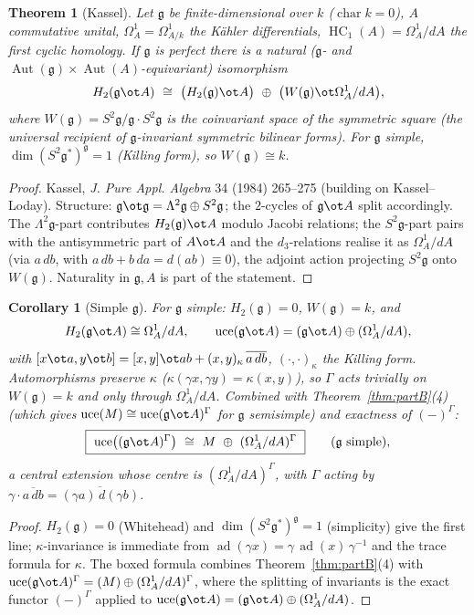 \documentclass{amsart}
\newtheorem{theorem}{Theorem}
\newtheorem{corollary}{Corollary}
\theoremstyle{definition}
\DeclareMathOperator{\uce}{uce}
\DeclareMathOperator{\HC}{HC}
\DeclareMathOperator{\Aut}{Aut}
\newcommand{\g}{\mathfrak{g}}
\newcommand{\Om}{\Omega}
\newcommand{\Gm}{\Gamma}
\begin{document}
\begin{theorem}[Kassel]\label{thm:kassel}
Let $\g$ be finite-dimensional over $k$ ($\operatorname{char}k=0$), $A$
commutative unital, $\Om^1_A=\Om^1_{A/k}$ the Kähler differentials,
$\HC_1(A)=\Om^1_A/dA$ the first cyclic homology.  If $\g$ is perfect there is a
natural ($\g$- and $\Aut(\g)\!\times\!\Aut(A)$-equivariant) isomorphism
\begin{equation}\label{eq:kassel}
   H_2(\g\ot A)\ \cong\ \bigl(H_2(\g)\ot A\bigr)\ \oplus\
   \bigl(W(\g)\ot\Om^1_A/dA\bigr),
\end{equation}
where $W(\g)=S^2\g/\g\!\cdot\!S^2\g$ is the coinvariant space of the symmetric
square (the universal recipient of $\g$-invariant symmetric bilinear forms).  For
$\g$ simple, $\dim(S^2\g^*)^{\g}=1$ (Killing form), so $W(\g)\cong k$.
\end{theorem}
\begin{proof}
Kassel, \emph{J. Pure Appl. Algebra} 34 (1984) 265--275 (building on
Kassel--Loday).  Structure: $\g\ot\g=\Lambda^2\g\oplus S^2\g$; the $2$-cycles of
$\g\ot A$ split accordingly.  The $\Lambda^2\g$-part contributes $H_2(\g)\ot A$
modulo Jacobi relations; the $S^2\g$-part pairs with the antisymmetric part of
$A\ot A$ and the $d_3$-relations realise it as $\Om^1_A/dA$ (via $a\,db$, with
$a\,db+b\,da=d(ab)\equiv0$), the adjoint action projecting $S^2\g$ onto $W(\g)$.
Naturality in $\g,A$ is part of the statement.
\end{proof}

\begin{corollary}[Simple $\g$]\label{cor:simple}
For $\g$ simple: $H_2(\g)=0$, $W(\g)=k$, and
\[
   H_2(\g\ot A)\cong\Om^1_A/dA,\qquad
   \uce(\g\ot A)=(\g\ot A)\oplus(\Om^1_A/dA),
\]
with $[x\ot a,y\ot b]=[x,y]\ot ab+(x,y)_\kappa\,\overline{a\,db}$,
$(\cdot,\cdot)_\kappa$ the Killing form.  Automorphisms preserve $\kappa$
($\kappa(\gamma x,\gamma y)=\kappa(x,y)$), so $\Gm$ acts trivially on $W(\g)=k$
and only through $\Om^1_A/dA$.  Combined with Theorem~\ref{thm:partB}(4) (which
gives $\uce(M)\cong\uce(\g\ot A)^{\Gm}$ for $\g$ semisimple) and exactness of
$(-)^{\Gm}$:
\[
   \boxed{\ \uce\bigl((\g\ot A)^{\Gm}\bigr)\ \cong\ M\ \oplus\ (\Om^1_A/dA)^{\Gm}\ }
   \qquad(\g\ \text{simple}),
\]
a central extension whose centre is $(\Om^1_A/dA)^{\Gm}$, with $\Gm$ acting by
$\gamma\cdot\overline{a\,db}=\overline{(\gamma a)\,d(\gamma b)}$.
\end{corollary}
\begin{proof}
$H_2(\g)=0$ (Whitehead) and $\dim(S^2\g^*)^\g=1$ (simplicity) give the first line;
$\kappa$-invariance is immediate from $\operatorname{ad}(\gamma x)=\gamma\,
\operatorname{ad}(x)\,\gamma^{-1}$ and the trace formula for $\kappa$.  The boxed
formula combines Theorem~\ref{thm:partB}(4) with
$\uce(\g\ot A)^{\Gm}=(M)\oplus(\Om^1_A/dA)^{\Gm}$, where the splitting of
invariants is the exact functor $(-)^{\Gm}$ applied to
$\uce(\g\ot A)=(\g\ot A)\oplus(\Om^1_A/dA)$.
\end{proof}
\end{document}
